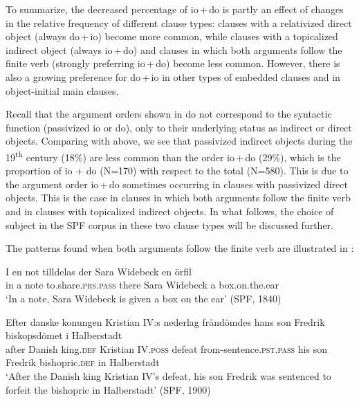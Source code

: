 \documentclass[output=paper]{langscibook}
\begin{document}
To summarize, the decreased percentage of io\,+\,do is partly an effect of changes in the relative frequency of different clause types: clauses with a relativized direct object (always do\,+\,io) become more common, while clauses with a topicalized indirect object (always io\,+\,do) and clauses in which both arguments follow the finite verb (strongly preferring io\,+\,do) become less common. However, there is also a growing preference for do\,+\,io in other types of embedded clauses and in object-initial main clauses.



Recall that the argument orders shown in  do not correspond to the syntactic function (passivized io or do), only to their underlying status as indirect or direct objects. Comparing with  above, we see that passivized indirect objects during the 19\textsuperscript{th} century (18\%) are less common than the order io\,+\,do (29\%), which is the proportion of  io + do (N=170) with respect to the total (N=580). This is due to the argument order io\,+\,do sometimes occurring in clauses with passivized direct objects. This is the case in clauses in which both arguments follow the finite verb and in clauses with topicalized indirect objects. In what follows, the choice of subject in the SPF corpus in these two clause types will be discussed further.



The patterns found when both arguments follow the finite verb are illustrated in :


\ea%
    \label{ex:falk:20}
\ea\label{ex:falk:20a}
\gll I  en  not  tilldelas            der  Sara  Widebeck  en  örfil\\
      in  a  note  to.share\textsc{.prs}.\textsc{pass}    there  Sara  Widebeck  a  box.on.the.ear\\
\glt ‘In a note, Sara Widebeck is given a box on the ear’ (SPF, 1840)

\ex\label{ex:falk:20b}
\gll Efter  danske  konungen  Kristian IV:s    nederlag  fråndömdes      hans  son  Fredrik  biskopsdömet  i  Halberstadt\\
after  Danish  king.\textsc{def}    Kristian IV.\textsc{poss}  defeat      from-sentence.\textsc{pst}.\textsc{pass}      his   son  Fredrik  bishopric.\textsc{def}  in  Halberstadt\\
\glt ‘After the Danish king Kristian IV’s defeat, his son Fredrik was sentenced to forfeit the bishopric in Halberstadt’ (SPF, 1900)
\end{document}
